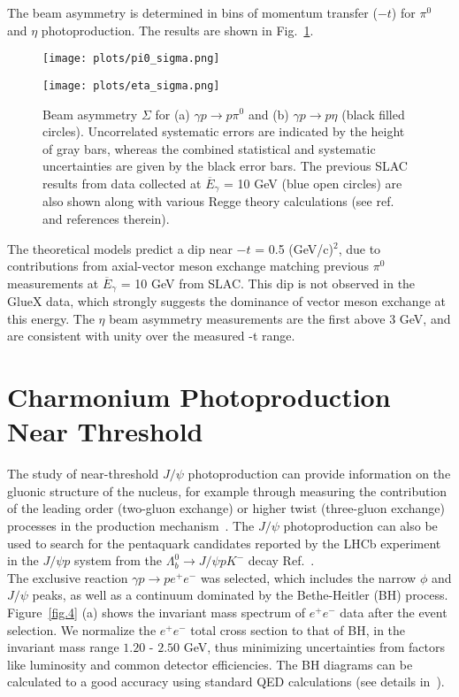 \documentclass[a4paper]{jpconf}
\begin{document}
\noindent The beam asymmetry is determined in bins of momentum transfer ($-t$) for $\pi^{0}$ and $\eta$ photoproduction. The results are shown in Fig.~\ref{fig.3}.

\begin{figure}[h]
    \centering
    \begin{minipage}{16pc}
        \texttt{[image: plots/pi0\_sigma.png]}
    \end{minipage}\hspace{3pc}%
    \begin{minipage}{16pc}
        \texttt{[image: plots/eta\_sigma.png]}
    \end{minipage}
    \caption{\label{fig.3} Beam asymmetry $\Sigma$ for (a) $\gamma p \rightarrow p \pi^{0}$ and (b) $\gamma p \rightarrow p \eta$ (black filled circles). Uncorrelated systematic errors are indicated by the height of gray bars, whereas the combined statistical and systematic uncertainties are given by the black error bars. The previous SLAC results from data collected at $\overline{{E}}_{\gamma}$ = 10 GeV (blue open circles) are also shown along with various Regge theory calculations (see ref.~\cite{ref.4} and references therein).}
\end{figure}

The theoretical models predict a dip near $-t$ = 0.5 (GeV/c)$^{2}$, due to contributions from axial-vector meson exchange matching previous $\pi^{0}$ measurements at $\overline{E}_{\gamma}$ = 10 GeV from SLAC. This dip is not observed in the GlueX data, which strongly suggests the dominance of vector meson exchange at this energy. The $\eta$ beam asymmetry measurements are the first above 3 GeV, and are consistent with unity over the measured -t range.

\section{Charmonium Photoproduction Near Threshold}
The study of near-threshold $J/\psi$ photoproduction can provide information on the gluonic structure of the nucleus, for example through measuring the contribution of the leading order (two-gluon exchange) or higher twist (three-gluon exchange) processes in the production mechanism~\cite{ref.5}. The $J/\psi$ photoproduction can also be used to search for the pentaquark candidates reported by the LHCb experiment in the $J/\psi p$ system from the $\Lambda^{0}_{b} \rightarrow J/\psi p K^{-}$ decay Ref.~\cite{ref.5}.\\
The exclusive reaction $\gamma p \rightarrow p e^{+}e^{-}$ was selected, which includes the narrow $\phi$ and $J/\psi$ peaks, as well as a continuum dominated by the Bethe-Heitler (BH) process. Figure~\ref{fig.4} (a) shows the invariant mass spectrum of $e^{+}e^{-}$ data after the event selection. We normalize the $e^{+}e^{-}$ total cross section to that of BH, in the invariant mass range $1.20$ - $2.50$ GeV, thus minimizing uncertainties from factors like luminosity and common detector efficiencies. The BH diagrams can be calculated to a good accuracy using standard QED calculations (see details in~\cite{ref.5}).
\end{document}
